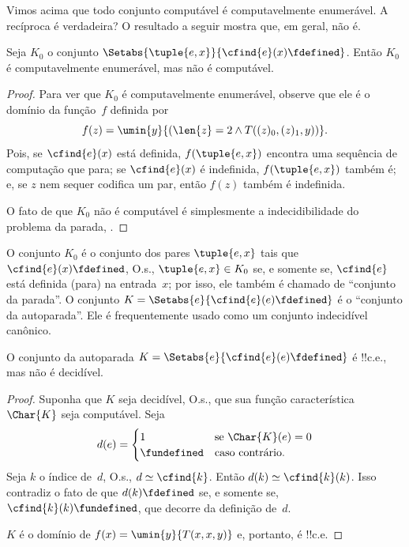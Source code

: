 \documentclass[../../../include/open-logic-section]{subfiles}
\begin{document}


Vimos acima que todo conjunto computável é computavelmente enumerável.
A recíproca é verdadeira? O resultado a seguir mostra que, em geral,
não é.

\begin{thm}
Seja $K_0$ o conjunto
$\Setabs{\tuple{e, x}}{\cfind{e}(x) \fdefined}$. Então $K_0$ é
computavelmente enumerável, mas não é computável.
\end{thm}

\begin{proof}
Para ver que $K_0$ é computavelmente enumerável, observe que ele é o
domínio da função~$f$ definida por
\[
f(z) = \umin{y}{(\len{z} = 2 \land T((z)_0, (z)_1, y))}.
\]
Pois, se $\cfind{e}(x)$ está definida, $f(\tuple{e, x})$ encontra uma
sequência de computação que para; se $\cfind{e}(x)$ é indefinida,
$f(\tuple{e, x})$ também é; e, se $z$ nem sequer codifica um par,
então $f(z)$ também é indefinida.

O fato de que $K_0$ não é computável é simplesmente a indecidibilidade
do problema da parada, .
\end{proof}

O conjunto $K_0$ é o conjunto dos pares $\tuple{e,x}$ tais que
$\cfind{e}(x) \fdefined$, O.s.\@, $\tuple{e,x} \in K_0$ se, e somente
se, $\cfind{e}$ está definida (para) na entrada~$x$; por isso, ele
também é chamado de ``conjunto da parada''. O conjunto
$K = \Setabs{e}{\cfind{e}(e) \fdefined}$ é o ``conjunto da
autoparada''. Ele é frequentemente usado como um conjunto indecidível
canônico.

\begin{thm}
O conjunto da autoparada
$K = \Setabs{e}{\cfind{e}(e) \fdefined}$ é !!{c.e.}, mas não é
decidível.
\end{thm}

\begin{proof}
  Suponha que $K$ seja decidível, O.s.\@, que sua função característica
  $\Char{K}$ seja computável. Seja
  \[d(e) = \begin{cases}
  1 & \text{se\/ $\Char{K}(e) = 0$}\\
  \fundefined & \text{caso contrário.}
  \end{cases}
  \] 
  Seja $k$ o índice de~$d$, O.s.\@, $d \simeq \cfind{k}$. Então $d(k)
  \simeq \cfind{k}(k)$. Isso contradiz o fato de que $d(k)
  \fdefined$ se, e somente se, $\cfind{k}(k) \fundefined$, que decorre
  da definição de~$d$.

  $K$ é o domínio de $f(x) = \umin{y}{T(x,x,y)}$ e, portanto, é
  !!{c.e.}
\end{proof}
\end{document}
